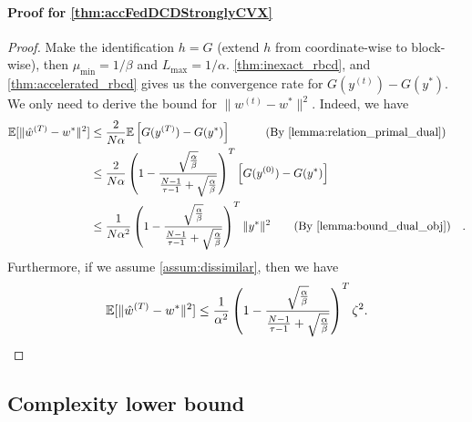 \paragraph{Proof for \autoref{thm:accFedDCDStronglyCVX}}
\begin{proof}
    Make the identification $h = G$ (extend $h$ from coordinate-wise to block-wise), then $\mu_{\min} = 1/\beta$ and $L_{\max} = 1/\alpha$. \autoref{thm:inexact_rbcd}, and \autoref{thm:accelerated_rbcd} gives us the convergence rate for $G(y^{(t)}) - G(y^*)$.
    We only need to derive the bound for $\|w^{(t)} - w^*\|^2$. Indeed, we have
    \begin{align*}
        \mE[\|\hat w^{(T)} - w^*\|^2] &\leq \frac{2}{N \alpha} \mE \left[G(y^{(T)}) - G(y^*) \right] \qquad \text{(By \autoref{lemma:relation_primal_dual})}
        \\&\leq \frac{2}{N \alpha}\left( 1 - \frac{ \sqrt{\frac{\alpha}{\beta}} }{ \frac{N-1}{\tau -1}+ \sqrt{\frac{\alpha}{\beta}} } \right)^{T} \left[ G(y^{(0)}) - G(y^*) \right]
        \\&\leq \frac{1}{N \alpha^2}\left( 1 - \frac{ \sqrt{\frac{\alpha}{\beta}} }{ \frac{N-1}{\tau -1}+ \sqrt{\frac{\alpha}{\beta}} } \right)^{T} \|y^*\|^2 \quad \text{(By \autoref{lemma:bound_dual_obj})} .
    \end{align*}
    Furthermore, if we assume \autoref{assum:dissimilar}, then we have 
    \[\mathbb{E}[\|\hat w^{(T)} - w^*\|^2] \leq \frac{1}{\alpha^2}\left( 1 - \frac{ \sqrt{\frac{\alpha}{\beta}} }{ \frac{N-1}{\tau -1}+ \sqrt{\frac{\alpha}{\beta}} } \right)^{T} \zeta^2.\]
\end{proof}


\subsection{Complexity lower bound} \label{appendix:lower_bound}

